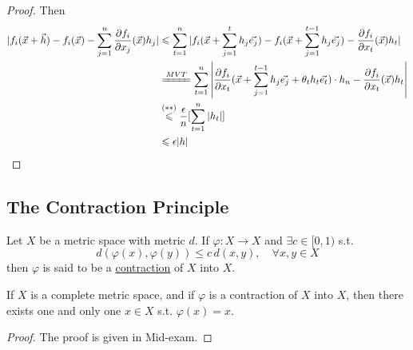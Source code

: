 \begin{proof}
      Then 
      \begin{align*}
        |f_i(\vec{x}+\vec{h})-f_i(\vec{x})-\sum\limits_{j=1}^{n}\frac{\partial f_i }{\partial x_j}(\vec{x})h_j|& \leqslant \sum\limits_{t=1}^{n} |f_i(\vec{x}+\sum\limits_{j=1}^{t } h_j\vec{e_j})-f_i(\vec{x}+\sum\limits_{j=1}^{t-1}h_j\vec{e_j})-\frac{\partial f_i }{\partial x_t}(\vec{x})h_t|\\
        &\xlongequal[]{MVT}\sum\limits_{t=1}^{n } \left|\frac{\partial f_i }{\partial x_t}(\vec{x}+\sum\limits_{j=1}^{t-1 } h_j\vec{e_j}+\theta_t h_t \vec{e_t})\cdot h_n-\frac{\partial f_i }{\partial x_t}(\vec{x})h_t \right|\\
        &\overset{(\ast\ast)}{\leqslant}\frac{\epsilon}{n}[\sum\limits_{t=1}^{n}|h_t| ]\\&\leqslant \epsilon|h| 
      \end{align*}
\end{proof}
\subsection{The Contraction Principle}
Let  $ X  $ be a metric space with metric  $ d  $. If  $ \varphi:X\rightarrow X    $ and  $ \exists c\in [0,1) $  s.t.
\[d(\varphi(x),\varphi(y)) \leqslant c\,d(x,y),\quad \forall x,y\in X \]
then  $ \varphi  $ is said to be a \underline{contraction} of  $ X  $ into  $ X $.
\begin{theorem}
    If  $ X  $ is a complete metric space, and if  $ \varphi $  is a contraction of  $ X  $ into  $ X  $, then there exists one and only one  $ x\in X  $ s.t.  $ \varphi(x)=x $. 
\end{theorem}
\begin{proof}
    The proof is given in Mid-exam.
\end{proof}  
